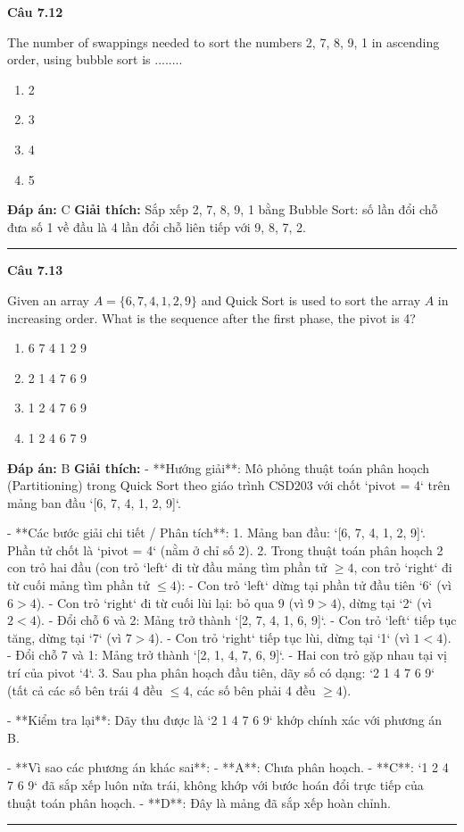 \documentclass[11pt,a4paper]{article}
\newenvironment{question}[1]{%
  \par\vspace{1em}\noindent\textbf{\large Câu #1}\par\vspace{0.4em}
}{%
  \par\vspace{1em}\hrule\vspace{0.6em}
}
\newenvironment{choices}{%
  \begin{enumerate}[label=\textbf{\Alph*.},leftmargin=2.2em,itemsep=2pt,topsep=3pt]
}{%
  \end{enumerate}
}
\newcommand{\choice}{\item}
\begin{document}
\begin{question}{7.12}
The number of swappings needed to sort the numbers 2, 7, 8, 9, 1 in ascending order, using bubble sort is ........
\begin{choices}
\choice 2
\choice 3
\choice 4
\choice 5
\end{choices}
\textbf{Đáp án:} C
\textbf{Giải thích:} Sắp xếp 2, 7, 8, 9, 1 bằng Bubble Sort: số lần đổi chỗ đưa số 1 về đầu là 4 lần đổi chỗ liên tiếp với 9, 8, 7, 2.
\end{question}

\begin{question}{7.13}
Given an array \(A = \{6, 7, 4, 1, 2, 9\}\) and Quick Sort is used to sort the array \(A\) in increasing order. What is the sequence after the first phase, the pivot is 4?
\begin{choices}
\choice 6 7 4 1 2 9
\choice 2 1 4 7 6 9
\choice 1 2 4 7 6 9
\choice 1 2 4 6 7 9
\end{choices}
\textbf{Đáp án:} B
\textbf{Giải thích:} - **Hướng giải**:
  Mô phỏng thuật toán phân hoạch (Partitioning) trong Quick Sort theo giáo trình CSD203 với chốt `pivot = 4` trên mảng ban đầu `[6, 7, 4, 1, 2, 9]`.

- **Các bước giải chi tiết / Phân tích**:
  1. Mảng ban đầu: `[6, 7, 4, 1, 2, 9]`. Phần tử chốt là `pivot = 4` (nằm ở chỉ số 2).
  2. Trong thuật toán phân hoạch 2 con trỏ hai đầu (con trỏ `left` đi từ đầu mảng tìm phần tử \(\ge 4\), con trỏ `right` đi từ cuối mảng tìm phần tử \(\le 4\)):
     - Con trỏ `left` dừng tại phần tử đầu tiên `6` (vì \(6 > 4\)).
     - Con trỏ `right` đi từ cuối lùi lại: bỏ qua 9 (vì \(9 > 4\)), dừng tại `2` (vì \(2 < 4\)).
     - Đổi chỗ 6 và 2: Mảng trở thành `[2, 7, 4, 1, 6, 9]`.
     - Con trỏ `left` tiếp tục tăng, dừng tại `7` (vì \(7 > 4\)).
     - Con trỏ `right` tiếp tục lùi, dừng tại `1` (vì \(1 < 4\)).
     - Đổi chỗ 7 và 1: Mảng trở thành `[2, 1, 4, 7, 6, 9]`.
     - Hai con trỏ gặp nhau tại vị trí của pivot `4`.
  3. Sau pha phân hoạch đầu tiên, dãy số có dạng: `2 1 4 7 6 9` (tất cả các số bên trái 4 đều \(\le 4\), các số bên phải 4 đều \(\ge 4\)).

- **Kiểm tra lại**:
  Dãy thu được là `2 1 4 7 6 9` khớp chính xác với phương án B.

- **Vì sao các phương án khác sai**:
  - **A**: Chưa phân hoạch.
  - **C**: `1 2 4 7 6 9` đã sắp xếp luôn nửa trái, không khớp với bước hoán đổi trực tiếp của thuật toán phân hoạch.
  - **D**: Đây là mảng đã sắp xếp hoàn chỉnh.
\end{question}
\end{document}
